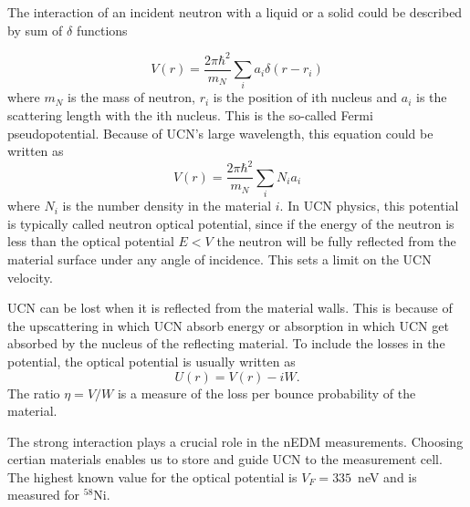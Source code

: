 The interaction of an incident neutron with a liquid or a solid could
be described by sum of $\delta$ functions

\begin{equation}
  \label{eqn:vFermi}
  V(r) = \frac{2\pi \hbar^2}{m_N} \sum_i a_i \delta (r - r_i)
\end{equation}
where $m_N$ is the mass of neutron, $r_i$ is the position of ith
nucleus and $a_i$ is the scattering length with the ith nucleus. This
is the so-called Fermi pseudopotential. Because of UCN's large
wavelength, this equation could be written as
\begin{equation}
V(r) = \frac{2\pi \hbar^2}{m_N}\sum_i N_ia_i
\end{equation}
where $N_i$ is the number density in the material $i$. In UCN physics,
this potential is typically called neutron optical potential, since if
the energy of the neutron is less than the optical potential $E < V$
the neutron will be fully reflected from the material surface under
any angle of incidence. This sets a limit on the UCN velocity.

UCN can be lost when it is reflected from the material walls.
This is because of the upscattering in which UCN absorb energy or
absorption in which UCN get absorbed by the nucleus of the reflecting
material. To include the losses in the potential, the optical
potential is usually written as
\begin{equation}
  U(r) = V(r) - iW.
\end{equation}
The ratio $\eta = V/W$ is a measure of the loss per bounce probability
of the material. 

The strong interaction plays a crucial role in the nEDM
measurements. Choosing certian materials enables us to store and guide
UCN to the measurement cell.  The highest known value for the optical
potential is $V_F=335$~neV and is measured for $^{58}$Ni.





